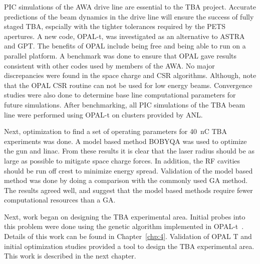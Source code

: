 
PIC simulations of the AWA drive line are essential to the TBA project. 
Accurate predictions of the beam dynamics in the drive line will ensure the 
success of fully staged TBA, espcially with the tighter tolerances required by the PETS apertures.
A new code, OPAL-t, was investigated as an alternative to ASTRA and GPT. 
The benefits of OPAL include being free and being able to run on a parallel platform.
A benchmark was done to ensure that OPAL gave results consistent with other codes used by members of the AWA.
No major discrepancies were found in the space charge and CSR algorithms.
Although, note that the OPAL CSR routine can not be used for low energy beams.
Convergence studies were also done to determine base line computational 
parameters for future simulations.
After benchmarking, all PIC simulations of the TBA beam line were performed using OPAL-t on clusters provided by ANL.

Next, optimization to find a set of operating parameters for
\SI{40}{nC} TBA experiments was done. A model based method BOBYQA was used to optimize the gun and linac. 
From these results it is clear that the laser radius should be as large as possible to mitigate space charge forces.
In addition, the RF cavities should be run off crest to minimize energy spread.
Validation of the model based method was done by doing a comparison with the commonly used GA method. 
The results agreed well, and suggest that the model based methods require fewer computational resources than a GA. 

Next, work began on designing the TBA experimental area. 
Initial probes into this problem were done using the genetic algorithm
implemented in OPAL-t~\cite{optpilot}. Details of this work can be found in Chapter~\ref{chp:4}.
Validation of OPAL T and initial optimization studies provided a tool to design the TBA experimental area.  
This work is described in the next chapter.






